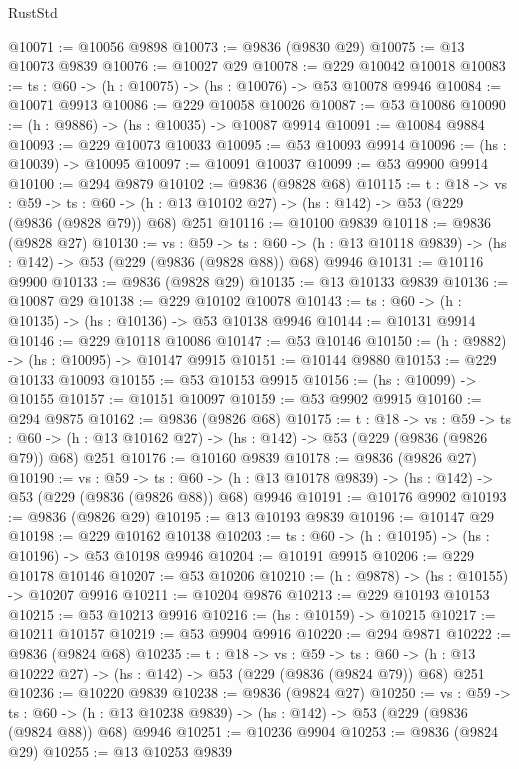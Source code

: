 \begin{lexlean}{RustStd}
\begin{coremodule}
@10071 := @10056 @9898
@10073 := @9836 (@9830 @29)
@10075 := @13 @10073 @9839
@10076 := @10027 @29
@10078 := @229 @10042 @10018
@10083 := {ts : @60} -> (h : @10075) -> (hs : @10076) -> @53 @10078 @9946
@10084 := @10071 @9913
@10086 := @229 @10058 @10026
@10087 := @53 @10086
@10090 := (h : @9886) -> (hs : @10035) -> @10087 @9914
@10091 := @10084 @9884
@10093 := @229 @10073 @10033
@10095 := @53 @10093 @9914
@10096 := (hs : @10039) -> @10095
@10097 := @10091 @10037
@10099 := @53 @9900 @9914
@10100 := @294 @9879
@10102 := @9836 (@9828 @68)
@10115 := {t : @18} ->
  {vs : @59} ->
  {ts : @60} -> (h : @13 @10102 @27) -> (hs : @142) -> @53 (@229 (@9836 (@9828 @79)) @68) @251
@10116 := @10100 @9839
@10118 := @9836 (@9828 @27)
@10130 := {vs : @59} ->
  {ts : @60} -> (h : @13 @10118 @9839) -> (hs : @142) -> @53 (@229 (@9836 (@9828 @88)) @68) @9946
@10131 := @10116 @9900
@10133 := @9836 (@9828 @29)
@10135 := @13 @10133 @9839
@10136 := @10087 @29
@10138 := @229 @10102 @10078
@10143 := {ts : @60} -> (h : @10135) -> (hs : @10136) -> @53 @10138 @9946
@10144 := @10131 @9914
@10146 := @229 @10118 @10086
@10147 := @53 @10146
@10150 := (h : @9882) -> (hs : @10095) -> @10147 @9915
@10151 := @10144 @9880
@10153 := @229 @10133 @10093
@10155 := @53 @10153 @9915
@10156 := (hs : @10099) -> @10155
@10157 := @10151 @10097
@10159 := @53 @9902 @9915
@10160 := @294 @9875
@10162 := @9836 (@9826 @68)
@10175 := {t : @18} ->
  {vs : @59} ->
  {ts : @60} -> (h : @13 @10162 @27) -> (hs : @142) -> @53 (@229 (@9836 (@9826 @79)) @68) @251
@10176 := @10160 @9839
@10178 := @9836 (@9826 @27)
@10190 := {vs : @59} ->
  {ts : @60} -> (h : @13 @10178 @9839) -> (hs : @142) -> @53 (@229 (@9836 (@9826 @88)) @68) @9946
@10191 := @10176 @9902
@10193 := @9836 (@9826 @29)
@10195 := @13 @10193 @9839
@10196 := @10147 @29
@10198 := @229 @10162 @10138
@10203 := {ts : @60} -> (h : @10195) -> (hs : @10196) -> @53 @10198 @9946
@10204 := @10191 @9915
@10206 := @229 @10178 @10146
@10207 := @53 @10206
@10210 := (h : @9878) -> (hs : @10155) -> @10207 @9916
@10211 := @10204 @9876
@10213 := @229 @10193 @10153
@10215 := @53 @10213 @9916
@10216 := (hs : @10159) -> @10215
@10217 := @10211 @10157
@10219 := @53 @9904 @9916
@10220 := @294 @9871
@10222 := @9836 (@9824 @68)
@10235 := {t : @18} ->
  {vs : @59} ->
  {ts : @60} -> (h : @13 @10222 @27) -> (hs : @142) -> @53 (@229 (@9836 (@9824 @79)) @68) @251
@10236 := @10220 @9839
@10238 := @9836 (@9824 @27)
@10250 := {vs : @59} ->
  {ts : @60} -> (h : @13 @10238 @9839) -> (hs : @142) -> @53 (@229 (@9836 (@9824 @88)) @68) @9946
@10251 := @10236 @9904
@10253 := @9836 (@9824 @29)
@10255 := @13 @10253 @9839

\end{coremodule}
\end{lexlean}
